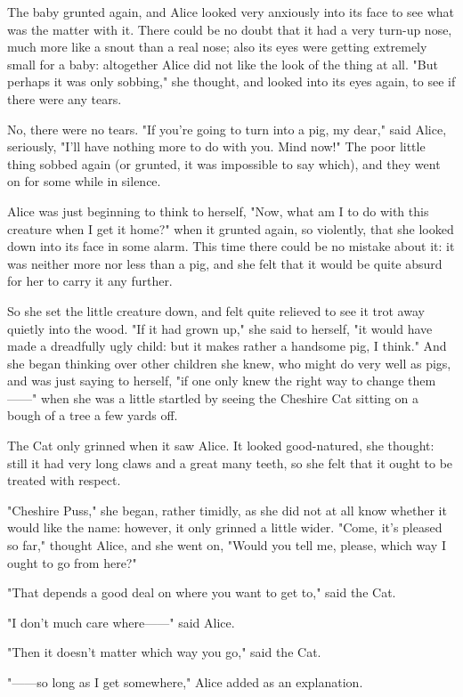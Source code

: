 The baby grunted again, and Alice looked very anxiously into its face to see what was the matter with it. There could be no doubt that it had a very turn-up nose, much more like a snout than a real nose; also its eyes were getting extremely small for a baby: altogether Alice did not like the look of the thing at all. "But perhaps it was only sobbing," she thought, and looked into its eyes again, to see if there were any tears.

No, there were no tears. "If you're going to turn into a pig, my dear," said Alice, seriously, "I'll have nothing more to do with you. Mind now!" The poor little thing sobbed again (or grunted, it was impossible to say which), and they went on for some while in silence.

​Alice was just beginning to think to herself, "Now, what am I to do with this creature when I get it home?" when it grunted again, so violently, that she looked down into its face in some alarm. This time there could be no mistake about it: it was neither more nor less than a pig, and she felt that it would be quite absurd for her to carry it any further.

So she set the little creature down, and felt quite relieved to see it trot away quietly into the wood. "If it had grown up," she said to herself, "it would have made a dreadfully ugly child: but it makes rather a handsome pig, I think." And she began thinking over other children she knew, who ​might do very well as pigs, and was just saying to herself, "if one only knew the right way to change them——" when she was a little startled by seeing the Cheshire Cat sitting on a bough of a tree a few yards off.

The Cat only grinned when it saw Alice. It looked good-natured, she thought: still it had very long claws and a great many teeth, so she felt that it ought to be treated with respect.

"Cheshire Puss," she began, rather timidly, as she did not at all know whether it would like the name: however, it only grinned a little wider. "Come, it's pleased so far," thought Alice, and she went on, "Would you tell me, please, which way I ought to go from here?"

"That depends a good deal on where you want to get to," said the Cat.

"I don't much care where——" said Alice.

"Then it doesn't matter which way you go," said the Cat.

"——so long as I get somewhere," Alice added as an explanation.

